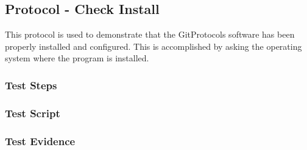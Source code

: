 \newpage
\subsection{Protocol - Check Install}
This protocol is used to demonstrate that the GitProtocols software has been
properly installed and configured.  This is accomplished by asking the operating
system where the program is installed.

\subsubsection{Test Steps}
      {}
      {}

\newpage
\subsubsection{Test Script}


\newpage
\subsubsection{Test Evidence}
      {}
      {}
